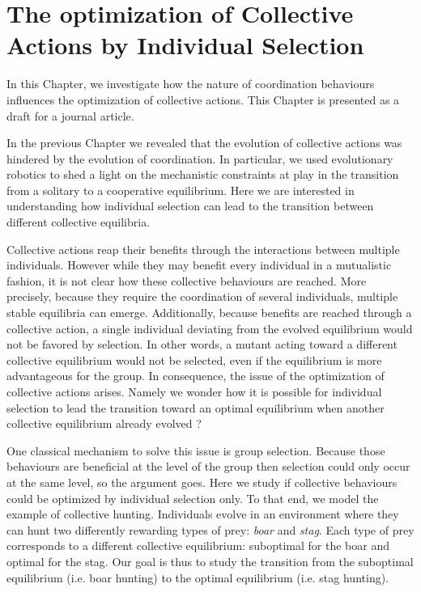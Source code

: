 \chapter{The optimization of Collective Actions by Individual Selection}
\label{chapter:C1_article2}

\setcounter{secnumdepth}{0}
\setcounter{minitocdepth}{1}
\minitoc[n] %

In this Chapter, we investigate how the nature of coordination behaviours influences the optimization of collective actions. This Chapter is presented as a draft for a journal article.

In the previous Chapter we revealed that the evolution of collective actions was hindered by the evolution of coordination. In particular, we used evolutionary robotics to shed a light on the mechanistic constraints at play in the transition from a solitary to a cooperative equilibrium. Here we are interested in understanding how individual selection can lead to the transition between different collective equilibria.

Collective actions reap their benefits through the interactions between multiple individuals. However while they may benefit every individual in a mutualistic fashion, it is not clear how these collective behaviours are reached. More precisely, because they require the coordination of several individuals, multiple stable equilibria can emerge. Additionally, because benefits are reached through a collective action, a single individual deviating from the evolved equilibrium would not be favored by selection. In other words, a mutant acting toward a different collective equilibrium would not be selected, even if the equilibrium is more advantageous for the group. In consequence, the issue of the optimization of collective actions arises. Namely we wonder how it is possible for individual selection to lead the transition toward an optimal equilibrium when another collective equilibrium already evolved ?

One classical mechanism to solve this issue is group selection. Because those behaviours are beneficial at the level of the group then selection could only occur at the same level, so the argument goes. Here we study if collective behaviours could be optimized by individual selection only. To that end, we model the example of collective hunting. Individuals evolve in an environment where they can hunt two differently rewarding types of prey: \emph{boar} and \emph{stag}. Each type of prey corresponds to a different collective equilibrium: suboptimal for the boar and optimal for the stag. Our goal is thus to study the transition from the suboptimal equilibrium (i.e. boar hunting) to the optimal equilibrium (i.e. stag hunting).

